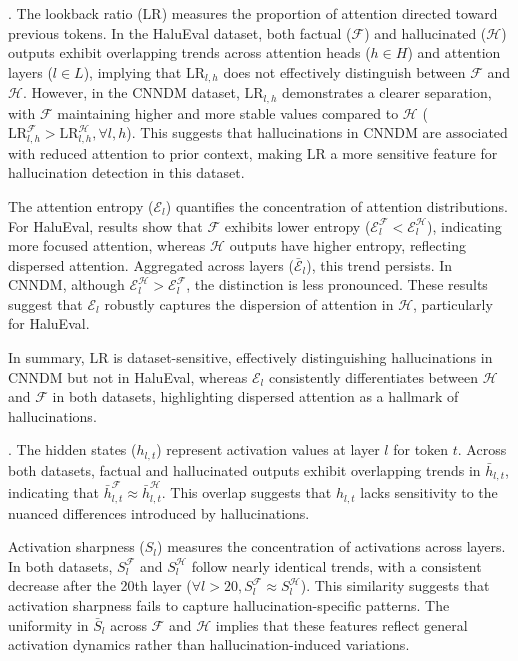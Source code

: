 .  
The lookback ratio (\(\text{LR}\)) measures the proportion of attention directed toward previous tokens. In the HaluEval dataset, both factual (\(\mathcal{F}\)) and hallucinated (\(\mathcal{H}\)) outputs exhibit overlapping trends across attention heads (\(h \in H\)) and attention layers (\(l \in L\)), implying that \(\text{LR}_{l,h}\) does not effectively distinguish between \(\mathcal{F}\) and \(\mathcal{H}\). However, in the CNNDM dataset, \(\text{LR}_{l,h}\) demonstrates a clearer separation, with \(\mathcal{F}\) maintaining higher and more stable values compared to \(\mathcal{H}\) (\( \text{LR}^{\mathcal{F}}_{l,h} > \text{LR}^{\mathcal{H}}_{l,h}, \forall l,h\)). This suggests that hallucinations in CNNDM are associated with reduced attention to prior context, making \(\text{LR}\) a more sensitive feature for hallucination detection in this dataset.

The attention entropy (\(\mathcal{E}_l\)) quantifies the concentration of attention distributions. For HaluEval, results show that \(\mathcal{F}\) exhibits lower entropy (\(\mathcal{E}_l^{\mathcal{F}} < \mathcal{E}_l^{\mathcal{H}}\)), indicating more focused attention, whereas \(\mathcal{H}\) outputs have higher entropy, reflecting dispersed attention. Aggregated across layers (\(\bar{\mathcal{E}}_l\)), this trend persists. In CNNDM, although \(\mathcal{E}_l^{\mathcal{H}} > \mathcal{E}_l^{\mathcal{F}}\), the distinction is less pronounced. These results suggest that \(\mathcal{E}_l\) robustly captures the dispersion of attention in \(\mathcal{H}\), particularly for HaluEval.

In summary, \(\text{LR}\) is dataset-sensitive, effectively distinguishing hallucinations in CNNDM but not in HaluEval, whereas \(\mathcal{E}_l\) consistently differentiates between \(\mathcal{H}\) and \(\mathcal{F}\) in both datasets, highlighting dispersed attention as a hallmark of hallucinations.

.  
The hidden states (\(h_{l,t}\)) represent activation values at layer \(l\) for token \(t\). Across both datasets, factual and hallucinated outputs exhibit overlapping trends in \(\bar{h}_{l,t}\), indicating that \(\bar{h}_{l,t}^{\mathcal{F}} \approx \bar{h}_{l,t}^{\mathcal{H}}\). This overlap suggests that \(h_{l,t}\) lacks sensitivity to the nuanced differences introduced by hallucinations.

Activation sharpness (\(S_l\)) measures the concentration of activations across layers. In both datasets, \(S_l^{\mathcal{F}}\) and \(S_l^{\mathcal{H}}\) follow nearly identical trends, with a consistent decrease after the 20th layer (\(\forall l > 20, S_l^{\mathcal{F}} \approx S_l^{\mathcal{H}}\)). This similarity suggests that activation sharpness fails to capture hallucination-specific patterns. The uniformity in \(\bar{S}_l\) across \(\mathcal{F}\) and \(\mathcal{H}\) implies that these features reflect general activation dynamics rather than hallucination-induced variations.


